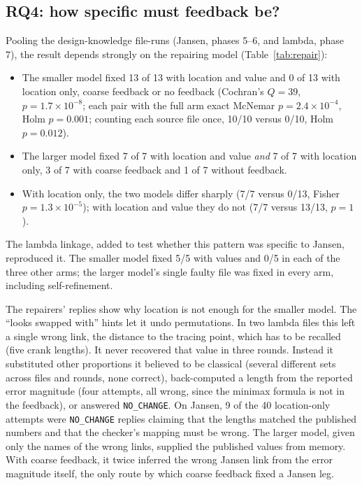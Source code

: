 \subsection{RQ4: how specific must feedback be?}\label{sec:rq4}

Pooling the design-knowledge file-runs (Jansen, phases 5--6, and lambda, phase 7), the result depends strongly on the repairing model (Table~\ref{tab:repair}):
\begin{itemize}
\item The smaller model fixed 13 of 13 with location and value and 0 of 13 with location only, coarse feedback or no feedback (Cochran's $Q=39$, $p=1.7\times10^{-8}$; each pair with the full arm exact McNemar $p=2.4\times10^{-4}$, Holm $p=0.001$; counting each source file once, 10/10 versus 0/10, Holm $p=0.012$).
\item The larger model fixed 7 of 7 with location and value \emph{and} 7 of 7 with location only, 3 of 7 with coarse feedback and 1 of 7 without feedback.
\item With location only, the two models differ sharply (7/7 versus 0/13, Fisher $p=1.3\times10^{-5}$); with location and value they do not (7/7 versus 13/13, $p=1$).
\end{itemize}
The lambda linkage, added to test whether this pattern was specific to Jansen, reproduced it. The smaller model fixed 5/5 with values and 0/5 in each of the three other arms; the larger model's single faulty file was fixed in every arm, including self-refinement.

The repairers' replies show why location is not enough for the smaller model. The ``looks swapped with'' hints let it undo permutations. In two lambda files this left a single wrong link, the distance to the tracing point, which has to be recalled (five crank lengths). It never recovered that value in three rounds. Instead it substituted other proportions it believed to be classical (several different sets across files and rounds, none correct), back-computed a length from the reported error magnitude (four attempts, all wrong, since the minimax formula is not in the feedback), or answered \texttt{NO\_CHANGE}. On Jansen, 9 of the 40 location-only attempts were \texttt{NO\_CHANGE} replies claiming that the lengths matched the published numbers and that the checker's mapping must be wrong. The larger model, given only the names of the wrong links, supplied the published values from memory. With coarse feedback, it twice inferred the wrong Jansen link from the error magnitude itself, the only route by which coarse feedback fixed a Jansen leg.

